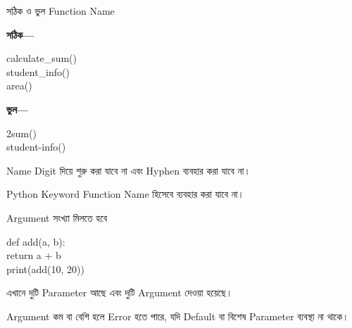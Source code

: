 \begin{codeoutputbox}{সঠিক ও ভুল Function Name}

\noindent
\begin{minipage}[t]{0.48\linewidth}
\codeheading

\textbf{সঠিক—}

\begin{english}
\ttfamily
calculate\_sum()\\
student\_info()\\
area()
\end{english}

\end{minipage}
\hfill
\begin{minipage}[t]{0.48\linewidth}
\outputheading

\textbf{ভুল—}

\begin{english}
\ttfamily
2sum()\\
student-info()
\end{english}

\medskip

Name Digit দিয়ে শুরু করা যাবে না এবং
Hyphen ব্যবহার করা যাবে না।

\end{minipage}

\end{codeoutputbox}

Python Keyword Function Name হিসেবে ব্যবহার করা যাবে না।



\begin{codeoutputbox}{Argument সংখ্যা মিলতে হবে}

\noindent
\begin{minipage}[t]{0.52\linewidth}
\codeheading

\begin{english}
\ttfamily
def add(a, b):\\
\hspace*{4mm}return a + b\\[0.5mm]
print(add(10, 20))
\end{english}

\end{minipage}
\hfill
\begin{minipage}[t]{0.44\linewidth}
\outputheading

\begin{center}
\textenglish{}
\end{center}

এখানে দুটি Parameter আছে এবং দুটি Argument দেওয়া হয়েছে।

Argument কম বা বেশি হলে Error হতে পারে,
যদি Default বা বিশেষ Parameter ব্যবস্থা না থাকে।

\end{minipage}

\end{codeoutputbox}

